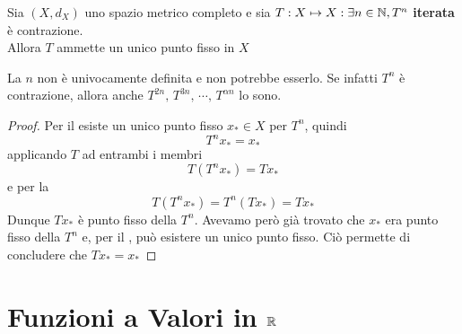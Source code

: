 \begin{theorem}
	\label{teo:iterata_contraz}
	Sia $(X,d_X)$ uno spazio metrico completo e sia $T:X\mapsto X : \exists n \in \mathbb{N}, T^n$ \textbf{iterata} è contrazione.\\
	Allora $T$ ammette un unico punto fisso in $X$
	\begin{note}
		La $n$ non è univocamente definita e non potrebbe esserlo. Se infatti $T^n$ è contrazione, allora anche $T^{2n},\, T^{3n},\, \cdots,\, T^{\alpha n}$ lo sono.
	\end{note}
	\begin{proof}
		Per il  esiste un unico punto fisso $x_* \in X$ per $T^n$, quindi
		$$T^nx_* = x_*$$
		applicando $T$ ad entrambi i membri
		$$T(T^{n}x_*) = Tx_*$$
		e per la 
		$$T(T^{n}x_*) = T^n(Tx_*) = Tx_*$$
		Dunque $Tx_*$ è punto fisso della $T^n$. Avevamo però già trovato che $x_*$ era punto fisso della $T^n$ e, per il , può esistere un unico punto fisso. Ciò permette di concludere che $Tx_* = x_*$
	\end{proof}
\end{theorem}

\section{Funzioni a Valori in $\protect \mathbb{R} $}
